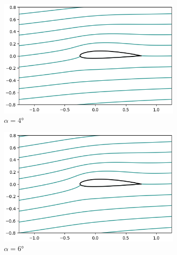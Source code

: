 \documentclass[letterpaper, openright, 12pt]{book}
\begin{document}
    \begin{figure}[htbp!]
        \centering
        \begin{subfigure}[c]{0.48\textwidth}
            \includegraphics[keepaspectratio, width=0.99\textwidth]
                {./img/potential_flow_2412_stream_4}
            \caption{$\alpha = 4\si{\degree}$}
            \label{fig:potential_flow_2412_stream_4}
        \end{subfigure}
        \hfill
        \begin{subfigure}[c]{0.48\textwidth}
            \includegraphics[keepaspectratio, width=0.99\textwidth]
                {./img/potential_flow_2412_stream_6}
            \caption{$\alpha = 6\si{\degree}$}
            \label{fig:potential_flow_2412_stream_6}
        \end{subfigure}
        \begin{subfigure}[c]{0.48\textwidth}

\end{subfigure}
\end{figure}
\end{document}
